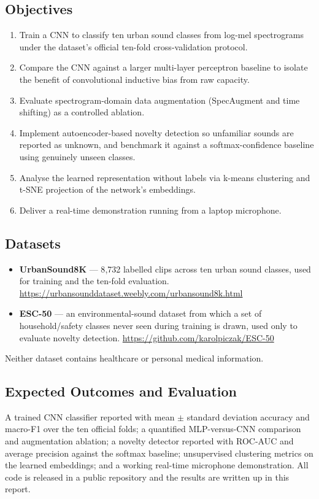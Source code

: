 \documentclass[11pt, a4paper]{article}
\newcommand{\dsurbanurl}{https://urbansounddataset.weebly.com/urbansound8k.html}
\newcommand{\dsescurl}{https://github.com/karolpiczak/ESC-50}
\begin{document}
\subsection*{Objectives}
\begin{enumerate}[leftmargin=2.2em]
    \item Train a CNN to classify ten urban sound classes from log-mel spectrograms under the dataset's official ten-fold cross-validation protocol.
    \item Compare the CNN against a larger multi-layer perceptron baseline to isolate the benefit of convolutional inductive bias from raw capacity.
    \item Evaluate spectrogram-domain data augmentation (SpecAugment and time shifting) as a controlled ablation.
    \item Implement autoencoder-based novelty detection so unfamiliar sounds are reported as unknown, and benchmark it against a softmax-confidence baseline using genuinely unseen classes.
    \item Analyse the learned representation without labels via k-means clustering and t-SNE projection of the network's embeddings.
    \item Deliver a real-time demonstration running from a laptop microphone.
\end{enumerate}

\subsection*{Datasets}
\begin{itemize}[leftmargin=2.2em]
    \item \textbf{UrbanSound8K} --- 8{,}732 labelled clips across ten urban sound classes, used for training and the ten-fold evaluation. \url{\dsurbanurl}
    \item \textbf{ESC-50} --- an environmental-sound dataset from which a set of household/safety classes never seen during training is drawn, used only to evaluate novelty detection. \url{\dsescurl}
\end{itemize}
Neither dataset contains healthcare or personal medical information.

\subsection*{Expected Outcomes and Evaluation}
A trained CNN classifier reported with mean $\pm$ standard deviation accuracy and macro-F1 over the ten official folds; a quantified MLP-versus-CNN comparison and augmentation ablation; a novelty detector reported with ROC-AUC and average precision against the softmax baseline; unsupervised clustering metrics on the learned embeddings; and a working real-time microphone demonstration. All code is released in a public repository and the results are written up in this report.
\end{document}
